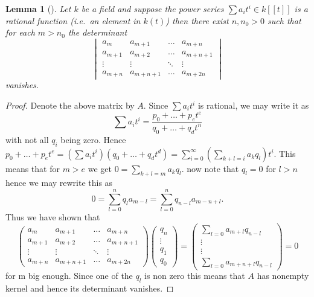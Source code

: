 \documentclass[11pt, a4paper, german]{article}
\theoremstyle{plain}
\newtheorem{lemma}[theorem]{Lemma}
\theoremstyle{definition}
\begin{document}
\begin{lemma}[{\cite[Lem.3.1]{bruhat}}]
    Let $k$ be a field and suppose the power series $\sum a_it^i \in k[[t]]$  is a rational function (i.e.\ an element in $k(t)$) then
    there exist $n, n_0 > 0$ such that for each $m > n_0$ the determinant
    \[
        \begin{vmatrix}
            a_m     & a_{m+1} & \dots & a_{m+n} \\
            a_{m+1} & a_{m+2} & \dots & a_{m+n+1} \\
            \vdots  & \vdots  & \ddots & \vdots \\
            a_{m+n} & a_{m+n+1} & \dots & a_{m+2n}
        \end{vmatrix}
    \]
    vanishes.
\end{lemma}
\begin{proof}
    Denote the above matrix by $A$. Since $\sum a_it^i$ is rational, we may write it as
    \[
        \sum a_it^i = \frac{p_0 + \dots + p_et^e}{q_0 + \dots + q_d t^n}
    \]
    with not all $q_i$ being zero.
    Hence 
    $p_0 + \dots + p_et^e = \left(\sum a_it^i\right)\left(q_0 + \dots + q_d t^d\right) = \sum_{i=0}^{\infty} \left(\sum_{k+l=i} a_kq_l\right)t^i$.
    This means that for $m > e$ we get $0 = \sum_{k+l=m} a_kq_l$. now note that $q_l = 0$ for $l > n$ hence we may rewrite this as
    \[
        0 = \sum_{l = 0}^{n} q_la_{m-l} = \sum_{l=0}^n q_{n-l}a_{m-n+l}.
    \]
    Thus we have shown that
    \[
        \begin{pmatrix}
            a_m     & a_{m+1} & \dots & a_{m+n} \\
            a_{m+1} & a_{m+2} & \dots & a_{m+n+1} \\
            \vdots  & \vdots  & \ddots & \vdots \\
            a_{m+n} & a_{m+n+1} & \dots & a_{m+2n}
        \end{pmatrix}
        \begin{pmatrix}
            q_n \\ \vdots \\ q_1 \\ q_0
        \end{pmatrix}
        =
        \begin{pmatrix}
            \sum_{l=0} a_{m+l}q_{n-l} \\ \vdots \\ \vdots \\ \sum_{l=0} a_{m+n+l}q_{n-l}
        \end{pmatrix}
        = 0
    \]
    for m big enough. Since one of the $q_l$ is non zero this means that $A$ has nonempty kernel and hence its determinant vanishes.
\end{proof}
\end{document}
